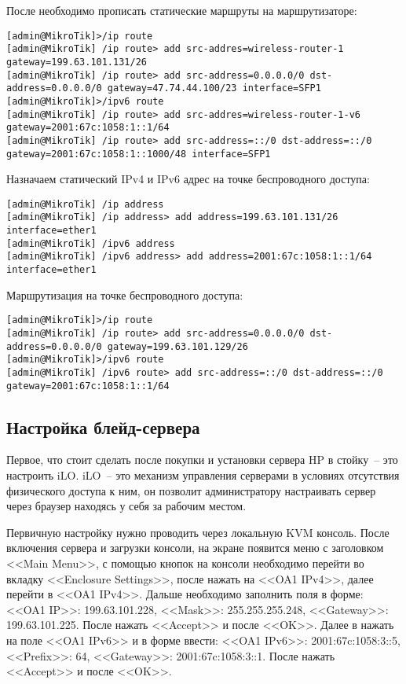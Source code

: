 После необходимо прописать статические маршруты на маршрутизаторе:

\begin{lstlisting}
[admin@MikroTik]>/ip route
[admin@MikroTik] /ip route> add src-addres=wireless-router-1 gateway=199.63.101.131/26
[admin@MikroTik] /ip route> add src-address=0.0.0.0/0 dst-address=0.0.0.0/0 gateway=47.74.44.100/23 interface=SFP1
[admin@MikroTik]>/ipv6 route
[admin@MikroTik] /ip route> add src-addres=wireless-router-1-v6 gateway=2001:67c:1058:1::1/64
[admin@MikroTik] /ip route> add src-address=::/0 dst-address=::/0 gateway=2001:67c:1058:1::1000/48 interface=SFP1
\end{lstlisting}

Назначаем статический IPv4 и IPv6 адрес на точке беспроводного доступа:
\begin{lstlisting}
[admin@MikroTik] /ip address
[admin@MikroTik] /ip address> add address=199.63.101.131/26 interface=ether1
[admin@MikroTik] /ipv6 address
[admin@MikroTik] /ipv6 address> add address=2001:67c:1058:1::1/64 interface=ether1
\end{lstlisting}

Маршрутизация на точке беспроводного доступа:
\begin{lstlisting}
[admin@MikroTik]>/ip route
[admin@MikroTik] /ip route> add src-address=0.0.0.0/0 dst-address=0.0.0.0/0 gateway=199.63.101.129/26
[admin@MikroTik]>/ipv6 route
[admin@MikroTik] /ipv6 route> add src-address=::/0 dst-address=::/0 gateway=2001:67c:1058:1::1/64
\end{lstlisting}

\subsection{Настройка блейд-сервера}

Первое, что стоит сделать после покупки и установки сервера HP в стойку~-- это настроить iLO. iLO~-- это механизм управления серверами в условиях отсутствия физического доступа к ним, он позволит администратору настраивать сервер через браузер находясь у себя за рабочим местом.

Первичную настройку нужно проводить через локальную KVM консоль. После включения сервера и загрузки консоли, на экране появится меню с заголовком <<Main Menu>>, с помощью кнопок на консоли необходимо перейти во вкладку <<Enclosure Settings>>, после нажать на <<OA1 IPv4>>, далее перейти в <<OA1 IPv4>>. Дальше необходимо заполнить поля в форме: <<OA1 IP>>: 199.63.101.228, <<Mask>>: 255.255.255.248, <<Gateway>>: 199.63.101.225. После нажать <<Accept>> и после <<OK>>. Далее в нажать на поле <<OA1 IPv6>> и в форме ввести: <<OA1 IPv6>>: 2001:67c:1058:3::5, <<Prefix>>: 64, <<Gateway>>: 2001:67c:1058:3::1. После нажать <<Accept>> и после <<OK>>.

